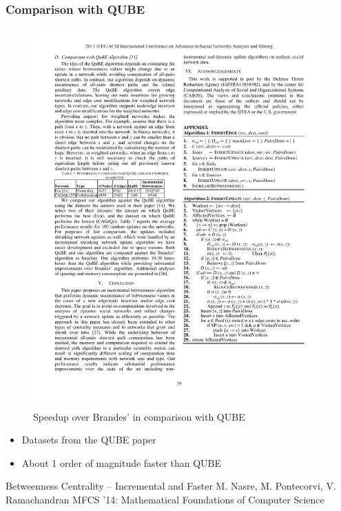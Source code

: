 \begin{frame}
  \frametitle{Comparison with QUBE}

  \begin{figure}[t]
    \centering
    \includegraphics[width=\textwidth, height=0.7\textheight, keepaspectratio]{imgs/kas-results2}
    \caption{Speedup over Brandes' in comparison with QUBE}
  \end{figure}

  \begin{itemize}
    \item Datasets from the QUBE paper
    \item About 1 order of magnitude faster than QUBE
  \end{itemize}

\end{frame}


\begin{frame}
  \centering
  \vfill
  {\huge Betweenness Centrality -- Incremental and Faster}
  \vfill
  {\Large M. Nasre, M. Pontecorvi, V. Ramachandran}
  \vfill
  {\large MFCS '14: Mathematical Foundations of Computer Science}
  \vfill
\end{frame}


